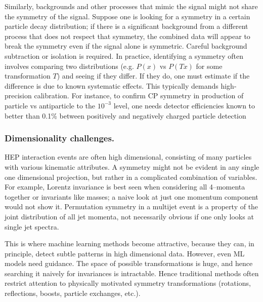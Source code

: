         Similarly, backgrounds and other processes that mimic the signal might not share the symmetry of the signal.
        Suppose one is looking for a symmetry in a certain particle decay distribution; if there is a significant background from a different process that does not respect that symmetry, the combined data will appear to break the symmetry even if the signal alone is symmetric.
        Careful background subtraction or isolation is required.
        In practice, identifying a symmetry often involves comparing two distributions (e.g. $P(x)$ vs $P(Tx)$ for some transformation $T$) and seeing if they differ. If they do, one must estimate if the difference is due to known systematic effects.
        This typically demands high-precision calibration.
        For instance, to confirm CP symmetry in production of particle vs antiparticle to the $10^{-3}$ level, one needs detector efficiencies known to better than 0.1\% between positively and negatively charged particle detection~\cite{Gordon:2013eha}

        \subsubsection{Dimensionality challenges.}
            HEP interaction events are often high dimensional, consisting of many particles with various kinematic attributes.
            A symmetry might not be evident in any single one dimensional projection, but rather in a complicated combination of variables.
            For example, Lorentz invariance is best seen when considering all 4--momenta together or invariants like masses; a naive look at just one momentum component would not show it.
            Permutation symmetry in a multijet event is a property of the joint distribution of all jet momenta, not necessarily obvious if one only looks at single jet spectra.
           
            This is where machine learning methods become attractive, because they can, in principle, detect subtle patterns in high dimensional data.
            However, even ML models need guidance.
            The space of possible transformations is huge, and hence searching it naively for invariances is intractable.
            Hence traditional methods often restrict attention to physically motivated symmetry transformations (rotations, reflections, boosts, particle exchanges, etc.).

